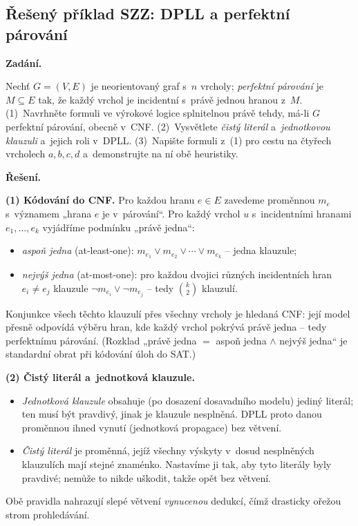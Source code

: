 \subsection{Řešený příklad SZZ: DPLL a perfektní párování}

\begin{priklad}
\par
\textbf{Zadání.}\par
Nechť $G=(V,E)$ je neorientovaný graf s~$n$ vrcholy; \emph{perfektní párování} je $M\subseteq E$ tak, že každý vrchol je incidentní s~právě jednou hranou z~$M$. (1)~Navrhněte formuli ve výrokové logice splnitelnou právě tehdy, má-li $G$ perfektní párování, obecně v~CNF. (2)~Vysvětlete \emph{čistý literál} a~\emph{jednotkovou klauzuli} a~jejich roli v~DPLL. (3)~Napište formuli z~(1) pro cestu na čtyřech vrcholech $a,b,c,d$ a~demonstrujte na ní obě heuristiky.

\medskip
\textbf{Řešení.}

\textbf{(1) Kódování do CNF.} Pro každou hranu $e\in E$ zavedeme proměnnou $m_e$ s~významem „hrana $e$ je v~párování``. Pro každý vrchol $u$ s~incidentními hranami $e_1,\dots,e_k$ vyjádříme podmínku „právě jedna``:
\begin{itemize}
  \item \emph{aspoň jedna} (at-least-one): $m_{e_1}\vee m_{e_2}\vee\cdots\vee m_{e_k}$ -- jedna klauzule;
  \item \emph{nejvýš jedna} (at-most-one): pro každou dvojici různých incidentních hran $e_i\neq e_j$ klauzule $\neg m_{e_i}\vee\neg m_{e_j}$ -- tedy $\binom{k}{2}$ klauzulí.
\end{itemize}
Konjunkce všech těchto klauzulí přes všechny vrcholy je hledaná CNF: její model přesně odpovídá výběru hran, kde každý vrchol pokrývá právě jedna -- tedy perfektnímu párování. (Rozklad „právě jedna $=$ aspoň jedna $\wedge$ nejvýš jedna`` je standardní obrat při kódování úloh do SAT.)

\textbf{(2) Čistý literál a~jednotková klauzule.}
\begin{itemize}
  \item \emph{Jednotková klauzule} obsahuje (po dosazení dosavadního modelu) jediný literál; ten musí být pravdivý, jinak je klauzule nesplněná. DPLL proto danou proměnnou ihned vynutí (jednotková propagace) bez větvení.
  \item \emph{Čistý literál} je proměnná, jejíž všechny výskyty v~dosud nesplněných klauzulích mají stejné znaménko. Nastavíme ji tak, aby tyto literály byly pravdivé; nemůže to nikde uškodit, takže opět bez větvení.
\end{itemize}
Obě pravidla nahrazují slepé větvení \emph{vynucenou} dedukcí, čímž drasticky ořežou strom prohledávání.


\end{priklad}
